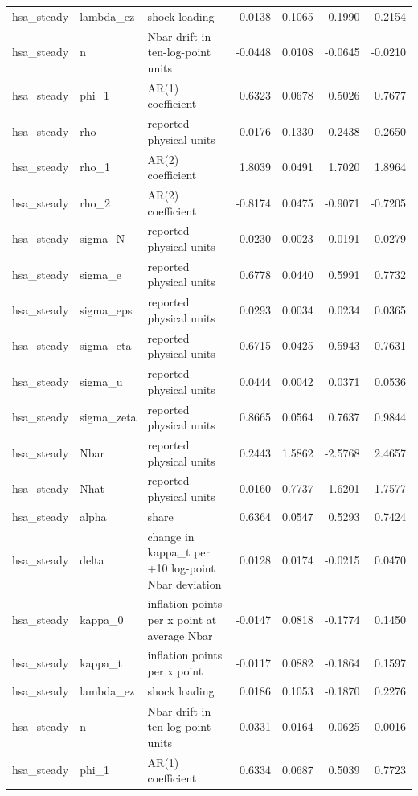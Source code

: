 \begin{tabular}{lllrrrr}
hsa\_steady & lambda\_ez & shock loading & 0.0138 & 0.1065 & -0.1990 & 0.2154 \\
hsa\_steady & n & Nbar drift in ten-log-point units & -0.0448 & 0.0108 & -0.0645 & -0.0210 \\
hsa\_steady & phi\_1 & AR(1) coefficient & 0.6323 & 0.0678 & 0.5026 & 0.7677 \\
hsa\_steady & rho & reported physical units & 0.0176 & 0.1330 & -0.2438 & 0.2650 \\
hsa\_steady & rho\_1 & AR(2) coefficient & 1.8039 & 0.0491 & 1.7020 & 1.8964 \\
hsa\_steady & rho\_2 & AR(2) coefficient & -0.8174 & 0.0475 & -0.9071 & -0.7205 \\
hsa\_steady & sigma\_N & reported physical units & 0.0230 & 0.0023 & 0.0191 & 0.0279 \\
hsa\_steady & sigma\_e & reported physical units & 0.6778 & 0.0440 & 0.5991 & 0.7732 \\
hsa\_steady & sigma\_eps & reported physical units & 0.0293 & 0.0034 & 0.0234 & 0.0365 \\
hsa\_steady & sigma\_eta & reported physical units & 0.6715 & 0.0425 & 0.5943 & 0.7631 \\
hsa\_steady & sigma\_u & reported physical units & 0.0444 & 0.0042 & 0.0371 & 0.0536 \\
hsa\_steady & sigma\_zeta & reported physical units & 0.8665 & 0.0564 & 0.7637 & 0.9844 \\
hsa\_steady & Nbar & reported physical units & 0.2443 & 1.5862 & -2.5768 & 2.4657 \\
hsa\_steady & Nhat & reported physical units & 0.0160 & 0.7737 & -1.6201 & 1.7577 \\
hsa\_steady & alpha & share & 0.6364 & 0.0547 & 0.5293 & 0.7424 \\
hsa\_steady & delta & change in kappa\_t per +10 log-point Nbar deviation & 0.0128 & 0.0174 & -0.0215 & 0.0470 \\
hsa\_steady & kappa\_0 & inflation points per x point at average Nbar & -0.0147 & 0.0818 & -0.1774 & 0.1450 \\
hsa\_steady & kappa\_t & inflation points per x point & -0.0117 & 0.0882 & -0.1864 & 0.1597 \\
hsa\_steady & lambda\_ez & shock loading & 0.0186 & 0.1053 & -0.1870 & 0.2276 \\
hsa\_steady & n & Nbar drift in ten-log-point units & -0.0331 & 0.0164 & -0.0625 & 0.0016 \\
hsa\_steady & phi\_1 & AR(1) coefficient & 0.6334 & 0.0687 & 0.5039 & 0.7723 \\

\end{tabular}

